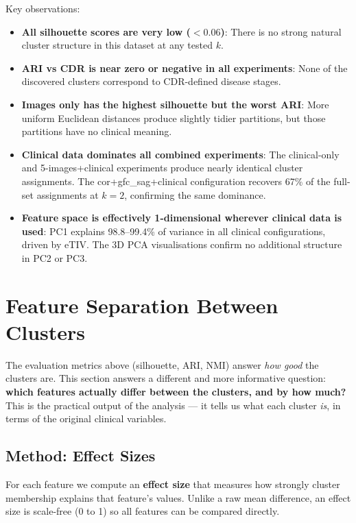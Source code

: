 \documentclass[12pt, a4paper]{article}
\begin{document}
Key observations:
\begin{itemize}
    \item \textbf{All silhouette scores are very low ($< 0.06$)}: There is no strong natural
    cluster structure in this dataset at any tested $k$.

    \item \textbf{ARI vs CDR is near zero or negative in all experiments}: None of the
    discovered clusters correspond to CDR-defined disease stages.

    \item \textbf{Images only has the highest silhouette but the worst ARI}: More uniform
    Euclidean distances produce slightly tidier partitions, but those partitions have no
    clinical meaning.

    \item \textbf{Clinical data dominates all combined experiments}: The clinical-only and
    5-images+clinical experiments produce nearly identical cluster assignments. The
    cor+gfc\_sag+clinical configuration recovers 67\% of the full-set assignments at $k=2$,
    confirming the same dominance.

    \item \textbf{Feature space is effectively 1-dimensional wherever clinical data is used}:
    PC1 explains 98.8--99.4\% of variance in all clinical configurations, driven by eTIV.
    The 3D PCA visualisations confirm no additional structure in PC2 or PC3.
\end{itemize}

\section{Feature Separation Between Clusters}

The evaluation metrics above (silhouette, ARI, NMI) answer \emph{how good} the clusters
are. This section answers a different and more informative question:
\textbf{which features actually differ between the clusters, and by how much?}
This is the practical output of the analysis --- it tells us what each cluster
\emph{is}, in terms of the original clinical variables.

\subsection{Method: Effect Sizes}

For each feature we compute an \textbf{effect size} that measures how strongly cluster
membership explains that feature's values. Unlike a raw mean difference, an effect size
is scale-free (0 to 1) so all features can be compared directly.
\end{document}
